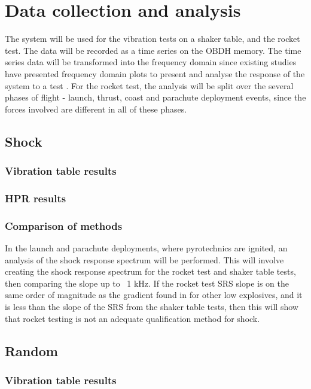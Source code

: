 \documentclass[draft]{report}
\begin{document}
\chapter{Data collection and analysis}

The system will be used for the vibration tests on a shaker table, and the rocket test. The data will be recorded as a time series on the OBDH memory. The time series data will be transformed into the frequency domain since existing studies have presented frequency domain plots to present and analyse the response of the system to a test \cite{nasa-pyroshock,nieto2019cubesat}. For the rocket test, the analysis will be split over the several phases of flight - launch, thrust, coast and parachute deployment events, since the forces involved are different in all of these phases.

\section{Shock}
\subsection{Vibration table results}
\subsection{HPR results}
\subsection{Comparison of methods}
In the launch and parachute deployments, where pyrotechnics are ignited, an analysis of the shock response spectrum will be performed. This will involve creating the shock response spectrum for the rocket test and shaker table tests, then comparing the slope up to ~1 kHz. If the rocket test SRS slope is on the same order of magnitude as the gradient found in \cite{wang2023numerical} for other low explosives, and it is less than the slope of the SRS from the shaker table tests, then this will show that rocket testing is not an adequate qualification method for shock.

\section{Random}
\subsection{Vibration table results}
\end{document}
